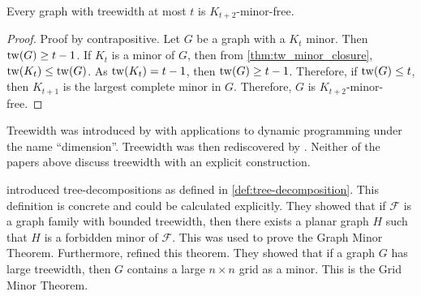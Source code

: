 

\begin{proposition}\label{thm:treewidth_clique-minor-free}
	Every graph with treewidth at most $t$ is $K_{t+2}$-minor-free. 
\end{proposition}
\begin{proof}
	Proof by contrapositive. Let $G$ be a graph with a $K_t$ minor. Then \(\operatorname{tw}(G) \geq t-1\).
	If \(K_t\) is a minor of \(G\), then from \cref{thm:tw_minor_closure}, \(\operatorname{tw}(K_t) \leq \operatorname{tw}(G)\). As \(\operatorname{tw}(K_t) = t-1\), then \(\operatorname{tw}(G) \geq t - 1\). Therefore, if $\operatorname{tw}(G) \leq t$, then $K_{t+1}$ is the largest complete minor in $G$. Therefore, $G$ is $K_{t + 2}$-minor-free. 
\end{proof}

Treewidth was introduced by \textcite{berteleChapterEliminationVariables1972} with applications to dynamic programming under the name ``dimension''. Treewidth was then rediscovered by \textcite{halinSfunctionsGraphs1976}. Neither of the papers above discuss treewidth with an explicit construction.

\textcite{robertsonGraphMinorsIII1984} introduced tree-decompositions as defined in \cref{def:tree-decomposition}. This definition is concrete and could be calculated explicitly. They showed that if $\mathcal{F}$ is a graph family with bounded treewidth, then there exists a planar graph $H$ such that $H$ is a forbidden minor of $\mathcal{F}$. This was used to prove the Graph Minor Theorem. Furthermore, \textcite{robertsonQuicklyExcludingPlanar1994} refined this theorem. They showed that if a graph $G$ has large treewidth, then $G$ contains a large $n \times n$ grid as a minor. This is the Grid Minor Theorem.